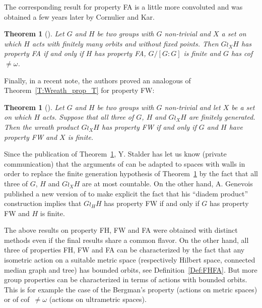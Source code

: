 \documentclass[a4paper]{article}
\newtheorem{thm}[lem]{Theorem}
\theoremstyle{definition}
\begin{document}
The corresponding result for property FA is a little more convoluted and was obtained a few years later by Cornulier and Kar.
%
%
\begin{thm}[\cite{Cornulier2011}]\label{Thm:FACK}
Let $G$ and $H$ be two groups with $G$ non-trivial and $X$ a set on which $H$ acts with finitely many orbits and without fixed points.
Then $G\wr_XH$ has property FA if and only if $H$ has property FA, $G/[G:G]$ is finite and $G$ has cof~$\neq\omega$.
\end{thm}
%
%
Finally, in a recent note, the authors proved an analogous of Theorem~\ref{T:Wreath_prop_T} for property FW:
%
%
\begin{thm}[\cite{LS2020}]\label{Thm:PropFW}
Let $G$ and $H$ be two groups with $G$ non-trivial and let $X$ be a set on which $H$ acts. Suppose that all three of $G$, $H$ and $G\wr_XH$ are finitely generated. Then the wreath product $G \wr_X H$ has property FW if and only if $G$ and $H$ have property FW and $X$ is finite.
\end{thm}
%
%
Since the publication of Theorem~\ref{Thm:PropFW}, Y. Stalder has let us know (private communication) that the arguments of \cite{LS2020} can be adapted to spaces with walls in order to replace the finite generation hypothesis of Theorem~\ref{Thm:PropFW} by the fact that all three of $G$, $H$ and $G\wr_XH$ are at most countable.
On the other hand, A. Genevois published a new version of \cite{2017arXiv170500834G} to make explicit the fact that his ``diadem product'' construction implies that $G\wr_HH$ has property FW if and only if $G$ has property FW and $H$ is finite.

The above results on property FH, FW and FA were obtained with distinct methods even if the final results share a common flavor.
On the other hand, all three of properties FH, FW and FA can be characterized by the fact that any isometric action on a suitable metric space (respectively Hilbert space, connected median graph and tree) has bounded orbits, see Definition~\ref{Def:FHFA}.
But more group properties can be characterized in terms of actions with bounded orbits. This is for example the case of the Bergman's property (actions on metric spaces) or of cof~$\neq\omega$ (actions on ultrametric spaces).
\end{document}
